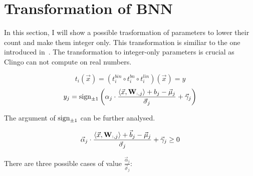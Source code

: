 \documentclass[
    digital,
    color,
    oneside,
    sansbold,
    lot,
    nolof
]{fithesis}
\begin{document}
\section{Transformation of BNN}

In this section, I will show a possible trasformation of parameters to
lower their count and make them integer only. This transformation is similiar
to the one introduced in~\cite{10.1145/3563212}. The transformation to integer-only
parameters is crucial as Clingo can not compute on real numbers.

\begin{equation*}
    t_i(\vec x) = (t_i^{bin} \circ t_i^{bn} \circ t_i^{lin})(\vec x) = y
\end{equation*}
\begin{equation*}
    y_j = \mathrm{sign}_{\pm 1}\left( \alpha_j \cdot \frac{\langle \vec x, \mathbf{W}_{:, j}\rangle + b_j - \vec \mu_j}{\vec \sigma_j} + \vec \gamma_j \right)
\end{equation*}

The argument of $\mathrm{sign}_{\pm 1}$ can be further analysed.

\begin{equation*}
    \vec \alpha_j \cdot \frac{\langle \vec x, \mathbf{W}_{:, j}\rangle + \vec b_j - \vec \mu_j}{\vec \sigma_j} + \vec \gamma_j \geq 0
\end{equation*}

There are three possible cases of value $\frac{\vec \alpha_j}{\vec \sigma_j}$:
\end{document}
